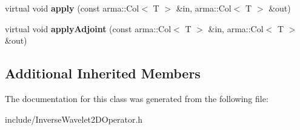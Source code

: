 \begin{DoxyCompactItemize}
\item 
virtual void {\bfseries apply} (const arma\+::\+Col$<$ T $>$ \&in, arma\+::\+Col$<$ T $>$ \&out)\hypertarget{classkl1p_1_1TInverseWavelet2DOperator_a96ed79949122a31fdf50e63b4b1de95d}{}\label{classkl1p_1_1TInverseWavelet2DOperator_a96ed79949122a31fdf50e63b4b1de95d}

\item 
virtual void {\bfseries apply\+Adjoint} (const arma\+::\+Col$<$ T $>$ \&in, arma\+::\+Col$<$ T $>$ \&out)\hypertarget{classkl1p_1_1TInverseWavelet2DOperator_a6258cdffe0de954287f9ad6c6f52f366}{}\label{classkl1p_1_1TInverseWavelet2DOperator_a6258cdffe0de954287f9ad6c6f52f366}

\end{DoxyCompactItemize}
\subsection*{Additional Inherited Members}


The documentation for this class was generated from the following file\+:\begin{DoxyCompactItemize}
\item 
include/Inverse\+Wavelet2\+D\+Operator.\+h\end{DoxyCompactItemize}
